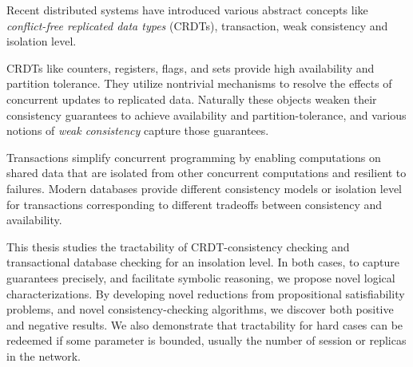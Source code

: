 

Recent distributed systems have introduced various abstract concepts like 
\emph{conflict-free replicated data types} (CRDTs), transaction, weak consistency and
isolation level.

CRDTs like counters, registers, flags, and sets provide high availability
and partition tolerance. They utilize nontrivial mechanisms to resolve the effects of
concurrent updates to replicated data. Naturally these objects weaken their 
consistency guarantees to achieve availability and partition-tolerance, and 
various notions of \emph{weak consistency} capture those guarantees.

Transactions simplify concurrent programming by enabling computations on shared data
that are isolated from other concurrent computations and resilient to failures.
Modern databases provide different consistency models or isolation level for transactions 
corresponding to different tradeoffs between consistency and availability.

This thesis studies the tractability of CRDT-consistency checking and transactional 
database checking for an insolation level. In both cases, to capture guarantees precisely,
and facilitate symbolic reasoning, we propose novel logical characterizations.
By developing novel reductions from propositional satisfiability problems, and novel
consistency-checking algorithms, we discover both positive and negative results. We also 
demonstrate that tractability for hard cases can be redeemed if some parameter is bounded,
usually the number of session or replicas in the network.

